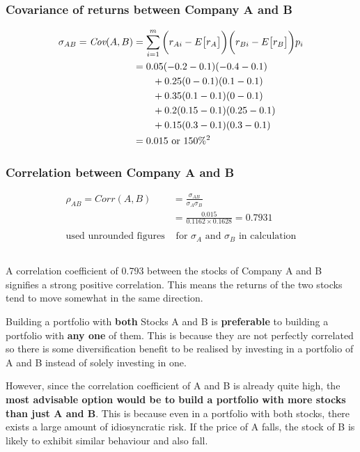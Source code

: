 \documentclass[12pt]{article}
\begin{document}
\subsubsection{Covariance of returns between Company A and B}
\begin{align*}
	\sigma_{AB} = \textit{Cov}(A,B) &= \sum^{m}_{i=1}\bigg(r_{Ai}-E\big[r_A\big]\bigg)\bigg(r_{Bi}-E\big[r_B\big]\bigg)p_i\\
	&=0.05(-0.2-0.1)(-0.4-0.1)\\
	&\text{\qquad}+0.25(0-0.1)(0.1-0.1)\\
	&\text{\qquad}+0.35(0.1-0.1)(0-0.1)\\
	&\text{\qquad}+0.2(0.15-0.1)(0.25-0.1)\\
	&\text{\qquad}+0.15(0.3-0.1)(0.3-0.1)\\
	&= 0.015 \text{ or } 150\%^2
\end{align*}

\subsubsection{Correlation between Company A and B}
\begin{align*}
	\rho_{AB} = \textit{Corr}(A,B) &= \frac{\sigma_{AB}}{\sigma_A\sigma_B}\\
	& = \frac{0.015}{0.1162\times0.1628} = 0.7931\\
	&\\
	\text{used unrounded figures} &\text{ for $\sigma_A$ and $\sigma_B$ in calculation}
\end{align*}

\subsection{}

A correlation coefficient of 0.793 between the stocks of Company A and B signifies a strong positive correlation. This means the returns of the two stocks tend to move somewhat in the same direction.

Building a portfolio with \textbf{both} Stocks A and B is \textbf{preferable} to building a portfolio with \textbf{any one} of them. This is because they are not perfectly correlated so there is some diversification benefit to be realised by investing in a portfolio of A and B instead of solely investing in one.

However, since the correlation coefficient of A and B is already quite high, the \textbf{most advisable option would be to build a portfolio with more stocks than just A and B}. This is because even in a portfolio with both stocks, there exists a large amount of idiosyncratic risk. If the price of A falls, the stock of B is likely to exhibit similar behaviour and also fall. 
\end{document}
